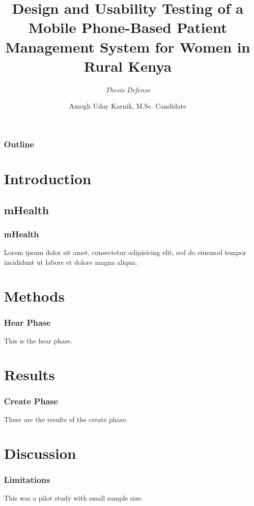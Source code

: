 \documentclass{beamer}
\author[Amogh Uday Karnik]{Amogh Uday Karnik,  M.Sc. Candidate}
\title{Design and Usability Testing of a Mobile Phone-Based Patient Management System for Women in Rural Kenya}
\subtitle{\textit{Thesis Defense}}
\institute[DGHI]{Duke Global Health Institute \\ Duke University}
\begin{document}
\begin{frame}[plain]
\titlepage
\end{frame}

\begin{frame}[plain]
\frametitle{Outline}
\tableofcontents
\end{frame}

\section{Introduction}

\subsection{mHealth}
\begin{frame}
\frametitle{mHealth}
Lorem ipsum dolor sit amet, consectetur adipisicing elit, sed do eiusmod tempor incididunt ut labore et dolore magna aliqua.
\end{frame}

\section{Methods}
\begin{frame}
\frametitle{Hear Phase}
This is the hear phase.
\end{frame}

\section{Results}
\begin{frame}
\frametitle{Create Phase}
These are the results of the create phase.
\end{frame}


\section{Discussion}
\begin{frame}
\frametitle{Limitations}
This was a pilot study with small sample size.
\end{frame}
\end{document}
